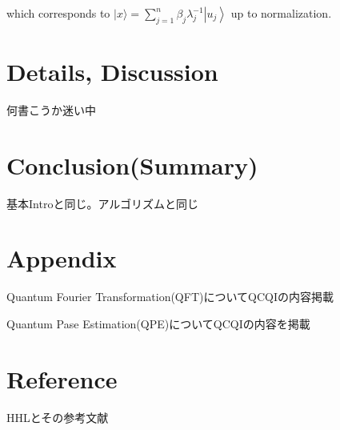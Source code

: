 \documentclass[b5paper,papersize,fleqn]{jsarticle}
\begin{document}
which corresponds to $|x\rangle=\sum_{j=1}^{n} \beta_{j} \lambda_{j}^{-1}\left|u_{j}\right\rangle$ up to normalization.


\section{Details, Discussion}
何書こうか迷い中

\section{Conclusion(Summary)}
基本Introと同じ。アルゴリズムと同じ

\section{Appendix}
Quantum Fourier Transformation(QFT)についてQCQIの内容掲載

Quantum Pase Estimation(QPE)についてQCQIの内容を掲載

\section{Reference}
HHLとその参考文献
\end{document}
